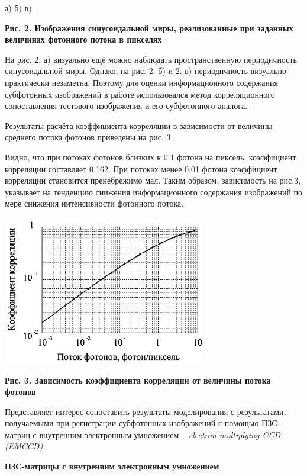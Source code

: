 \documentclass[11pt]{article}
\begin{document}
\qquad  \qquad  а)  \qquad  \qquad \qquad  \qquad \quad б)  \qquad  \qquad  \qquad  \qquad  в)

\begin{center}
\textbf{Рис. 2. Изображения синусоидальной миры, реализованные при заданных
величинах фотонного потока в пикселях}
\end{center}

На рис. 2. а) визуально ещё можно наблюдать пространственную периодичность синусоидальной миры. Однако, на рис. 2. б) и 2. в) периодичность визуально
практически незаметна. Поэтому для оценки информационного содержания субфотонных изображений в работе использовался метод корреляционного сопоставления тестового изображения и его субфотонного аналога.

Результаты расчёта коэффициента корреляции в зависимости от величины среднего потока фотонов приведены на рис. 3.

Видно, что при потоках фотонов близких к 0.1 фотона на пиксель, коэффициент корреляции составляет 0.162. При потоках менее 0.01 фотона коэффициент корреляции становится пренебрежимо мал. Таким образом, зависимость на рис.3, указывает на тенденцию снижения информационного содержания изображений
по мере снижения интенсивности фотонного потока.

\includegraphics[width=0.8\linewidth]{7.png}

\begin{center}
\textbf{Рис. 3. Зависимость коэффициента корреляции от величины потока фотонов}
\end{center}

Представляет интерес сопоставить результаты моделирования с результатами,
получаемыми при регистрации субфотонных изображений с помощью ПЗС-матриц с внутренним электронным умножением – \textit{electron multiplying CCD (EMCCD)}.
\begin{center}
\textbf{ПЗС-матрицы с внутренним электронным умножением}
\end{center}
\end{document}
